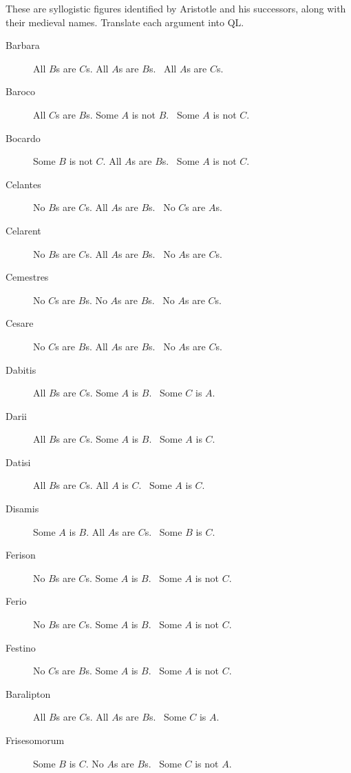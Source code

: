 \problempart
\label{pr.BarbaraEtc}
These are syllogistic figures identified by Aristotle and his successors, along with their medieval names. Translate each argument into QL.
\begin{description}
\item[Barbara] All $B$s are $C$s. All $A$s are $B$s.
	\therefore\  All $A$s are $C$s.
\item[Baroco] All $C$s are $B$s. Some $A$ is not $B$.
	\therefore\  Some $A$ is not $C$.
\item[Bocardo] Some $B$ is not $C$. All $A$s are $B$s.
	\therefore\  Some $A$ is not $C$.
\item[Celantes] No $B$s are $C$s. All $A$s are $B$s.
	\therefore\  No $C$s are $A$s.
\item[Celarent] No $B$s are $C$s. All $A$s are $B$s.
	\therefore\  No $A$s are $C$s.
\item[Cemestres] No $C$s are $B$s. No $A$s are $B$s.
	\therefore\  No $A$s are $C$s.
\item[Cesare] No $C$s are $B$s. All $A$s are $B$s.
	\therefore\  No $A$s are $C$s.
\item[Dabitis] All $B$s are $C$s. Some $A$ is $B$.
	\therefore\  Some $C$ is $A$.
\item[Darii] All $B$s are $C$s. Some $A$ is $B$.
	\therefore\  Some $A$ is $C$.
\item[Datisi] All $B$s are $C$s. All $A$ is $C$.
	\therefore\  Some $A$ is $C$.
\item[Disamis] Some $A$ is $B$. All $A$s are $C$s.
	\therefore\  Some $B$ is $C$.
\item[Ferison] No $B$s are $C$s. Some $A$ is $B$.
	\therefore\  Some $A$ is not $C$.
\item[Ferio] No $B$s are $C$s. Some $A$ is $B$.
	\therefore\  Some $A$ is not $C$.
\item[Festino] No $C$s are $B$s. Some $A$ is $B$.
	\therefore\  Some $A$ is not $C$.
\item[Baralipton] All $B$s are $C$s. All $A$s are $B$s.
	\therefore\  Some $C$ is $A$.
\item[Frisesomorum] Some $B$ is $C$. No $A$s are $B$s.
	\therefore\  Some $C$ is not $A$.
\end{description}



